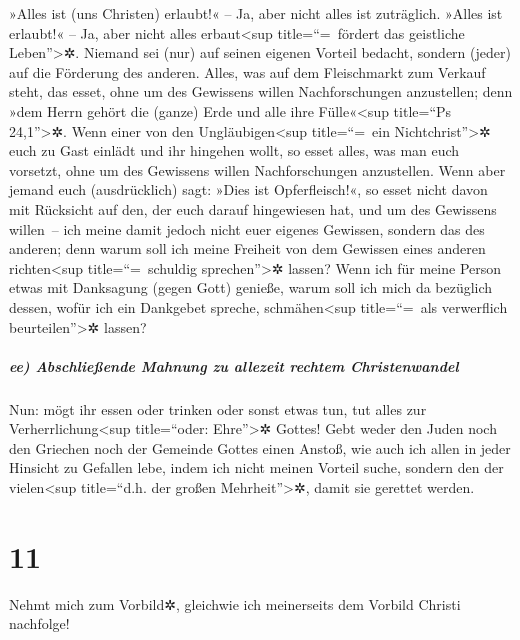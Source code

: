  »Alles ist (uns Christen) erlaubt!« -- Ja, aber nicht
alles ist zuträglich. »Alles ist erlaubt!« -- Ja, aber nicht alles
erbaut\textless sup title=``=~fördert das geistliche
Leben''\textgreater✲.  Niemand sei (nur) auf seinen
eigenen Vorteil bedacht, sondern (jeder) auf die Förderung des anderen.
 Alles, was auf dem Fleischmarkt zum Verkauf steht, das
esset, ohne um des Gewissens willen Nachforschungen anzustellen;
 denn »dem Herrn gehört die (ganze) Erde und alle ihre
Fülle«\textless sup title=``Ps 24,1''\textgreater✲.  Wenn
einer von den Ungläubigen\textless sup title=``=~ein
Nichtchrist''\textgreater✲ euch zu Gast einlädt und ihr hingehen wollt,
so esset alles, was man euch vorsetzt, ohne um des Gewissens willen
Nachforschungen anzustellen.  Wenn aber jemand euch
(ausdrücklich) sagt: »Dies ist Opferfleisch!«, so esset nicht davon mit
Rücksicht auf den, der euch darauf hingewiesen hat, und um des Gewissens
willen~--  ich meine damit jedoch nicht euer eigenes
Gewissen, sondern das des anderen; denn warum soll ich meine Freiheit
von dem Gewissen eines anderen richten\textless sup title=``=~schuldig
sprechen''\textgreater✲ lassen?  Wenn ich für meine
Person etwas mit Danksagung (gegen Gott) genieße, warum soll ich mich da
bezüglich dessen, wofür ich ein Dankgebet spreche, schmähen\textless sup
title=``=~als verwerflich beurteilen''\textgreater✲ lassen?

\hypertarget{ee-abschlieuxdfende-mahnung-zu-allezeit-rechtem-christenwandel}{%
\subparagraph{ee) Abschließende Mahnung zu allezeit rechtem
Christenwandel}\label{ee-abschlieuxdfende-mahnung-zu-allezeit-rechtem-christenwandel}}

 Nun: mögt ihr essen oder trinken oder sonst etwas tun,
tut alles zur Verherrlichung\textless sup title=``oder:
Ehre''\textgreater✲ Gottes!  Gebt weder den Juden noch
den Griechen noch der Gemeinde Gottes einen Anstoß,  wie
auch ich allen in jeder Hinsicht zu Gefallen lebe, indem ich nicht
meinen Vorteil suche, sondern den der vielen\textless sup title=``d.h.
der großen Mehrheit''\textgreater✲, damit sie gerettet werden.

\hypertarget{section-10}{%
\section{11}\label{section-10}}

 Nehmt mich zum Vorbild✲, gleichwie ich meinerseits dem
Vorbild Christi nachfolge!

